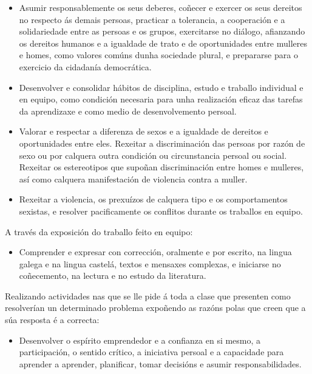 \begin{itemize}
    \item Asumir responsablemente os seus deberes, coñecer e exercer os seus dereitos no respecto ás demais persoas, practicar a tolerancia, a cooperación e a solidariedade entre as persoas e os grupos, exercitarse no diálogo, afianzando os dereitos humanos e a igualdade de trato e de oportunidades entre mulleres e homes, como valores comúns dunha sociedade plural, e prepararse para o exercicio da cidadanía democrática.

    \item Desenvolver e consolidar hábitos de disciplina, estudo e traballo individual e en equipo, como condición necesaria para unha realización eficaz das tarefas da aprendizaxe e como medio de desenvolvemento persoal.

    \item Valorar e respectar a diferenza de sexos e a igualdade de dereitos e oportunidades entre eles. Rexeitar a discriminación das persoas por razón de sexo ou por calquera outra condición ou circunstancia persoal ou social. Rexeitar os estereotipos que supoñan discriminación entre homes e mulleres, así como calquera manifestación de violencia contra a muller.

    \item Rexeitar a violencia, os prexuízos de calquera tipo e os comportamentos sexistas, e resolver pacificamente os conflitos durante os traballos en equipo.
\end{itemize}

A través da exposición do traballo feito en equipo:

\begin{itemize}
    \item Comprender e expresar con corrección, oralmente e por escrito, na lingua galega e na lingua castelá, textos e mensaxes complexas, e iniciarse no coñecemento, na lectura e no estudo da literatura.
\end{itemize}

Realizando actividades nas que se lle pide á toda a clase que presenten como resolverían un determinado problema expoñendo as razóns polas que creen que a súa resposta é a correcta:
\begin{itemize}
    \item Desenvolver o espírito emprendedor e a confianza en si mesmo, a participación, o sentido crítico, a iniciativa persoal e a capacidade para aprender a aprender, planificar, tomar decisións e asumir responsabilidades.
\end{itemize}

